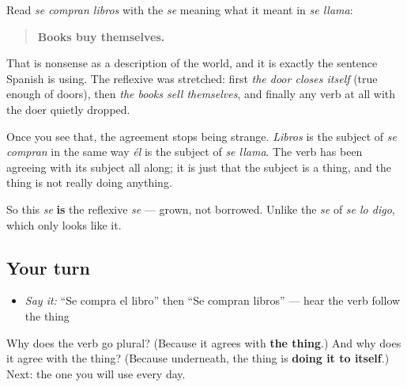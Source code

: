 \begin{cousinweb}
Read \emph{se compran libros} with the \emph{se} meaning what it meant in \emph{se llama}:

\begin{quote}
\textbf{Books buy themselves.}
\end{quote}

That is nonsense as a description of the world, and it is exactly the sentence Spanish is using. The reflexive was stretched: first \emph{the door closes itself} (true enough of doors), then \emph{the books sell themselves}, and finally any verb at all with the doer quietly dropped.

Once you see that, the agreement stops being strange. \emph{Libros} is the subject of \emph{se compran} in the same way \emph{él} is the subject of \emph{se llama}. The verb has been agreeing with its subject all along; it is just that the subject is a thing, and the thing is not really doing anything.

So this \emph{se} \textbf{is} the reflexive \emph{se} — grown, not borrowed. Unlike the \emph{se} of \emph{se lo digo}, which only looks like it.
\end{cousinweb}

\subsection*{Your turn}
\begin{itemize}
\raggedright
  \item \emph{Say it:} \textquotedblleft{}Se compra el libro\textquotedblright{} then \textquotedblleft{}Se compran libros\textquotedblright{} — hear the verb follow the thing
\end{itemize}

\begin{tcolorbox}[breakable,colback=teal!4,colframe=teal!35!black,title={Before you move on}]
Why does the verb go plural? (Because it agrees with \textbf{the thing}.) And why does it agree with the thing? (Because underneath, the thing is \textbf{doing it to itself}.) Next: the one you will use every day.
\end{tcolorbox}
